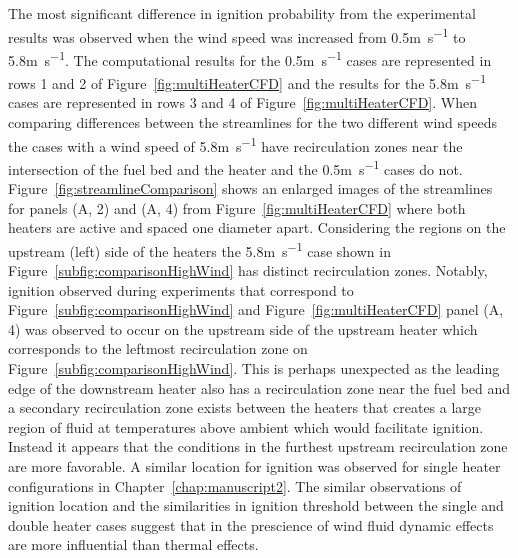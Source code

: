     The most significant difference in ignition probability from the experimental results was observed when the wind speed was increased from 0.5\si{\meter\per\second} to 5.8\si{\meter\per\second}. The computational results for the 0.5\si{\meter\per\second} cases are represented in rows 1 and 2 of Figure~\ref{fig:multiHeaterCFD} and the results for the 5.8\si{\meter\per\second} cases are represented in rows 3 and 4 of Figure~\ref{fig:multiHeaterCFD}. When comparing differences between the streamlines for the two different wind speeds the cases with a wind speed of 5.8\si{\meter\per\second} have recirculation zones near the intersection of the fuel bed and the heater and the 0.5\si{\meter\per\second} cases do not. Figure~\ref{fig:streamlineComparison} shows an enlarged images of the streamlines for panels (A, 2) and (A, 4) from Figure~\ref{fig:multiHeaterCFD} where both heaters are active and spaced one diameter apart. Considering the regions on the upstream (left) side of the heaters the 5.8\si{\meter\per\second} case shown in Figure~\ref{subfig:comparisonHighWind} has distinct recirculation zones. Notably, ignition observed during experiments that correspond to Figure~\ref{subfig:comparisonHighWind} and Figure~\ref{fig:multiHeaterCFD} panel (A, 4) was observed to occur on the upstream side of the upstream heater which corresponds to the leftmost recirculation zone on Figure~\ref{subfig:comparisonHighWind}. This is perhaps unexpected as the leading edge of the downstream heater also has a recirculation zone near the fuel bed and a secondary recirculation zone exists between the heaters that creates a large region of fluid at temperatures above ambient which would facilitate ignition. Instead it appears that the conditions in the furthest upstream recirculation zone are more favorable. A similar location for ignition was observed for single heater configurations in Chapter~\ref{chap:manuscript2}. The similar observations of ignition location and the similarities in ignition threshold between the single and double heater cases suggest that in the prescience of wind fluid dynamic effects are more influential than thermal effects.
